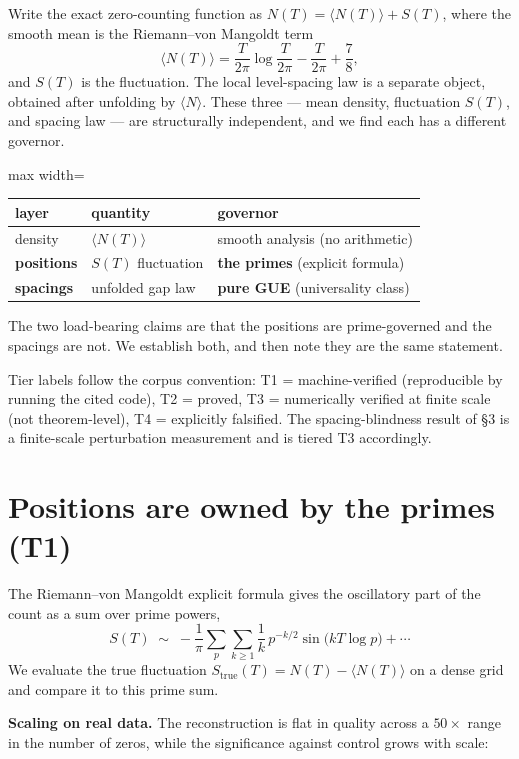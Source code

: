 \documentclass[11pt]{article}
\begin{document}
Write the exact zero-counting function as $N(T) = \langle N(T)\rangle + S(T)$, where the smooth mean is the Riemann--von Mangoldt term
\[
\langle N(T)\rangle = \frac{T}{2\pi}\log\frac{T}{2\pi} - \frac{T}{2\pi} + \frac{7}{8},
\]
and $S(T)$ is the fluctuation. The local level-spacing law is a separate object, obtained after unfolding by $\langle N\rangle$. These three --- mean density, fluctuation $S(T)$, and spacing law --- are structurally independent, and we find each has a different governor.

\begin{center}
\begin{adjustbox}{max width=\linewidth}\begin{tabular}{lll}
\toprule
layer & quantity & governor \\
\midrule
density & $\langle N(T)\rangle$ & smooth analysis (no arithmetic) \\
\textbf{positions} & $S(T)$ fluctuation & \textbf{the primes} (explicit formula) \\
\textbf{spacings} & unfolded gap law & \textbf{pure GUE} (universality class) \\
\bottomrule
\end{tabular}\end{adjustbox}
\end{center}

The two load-bearing claims are that the positions are prime-governed and the spacings are not. We establish both, and then note they are the same statement.

Tier labels follow the corpus convention: T1 = machine-verified (reproducible by running the cited code), T2 = proved, T3 = numerically verified at finite scale (not theorem-level), T4 = explicitly falsified. The spacing-blindness result of \S3 is a finite-scale perturbation measurement and is tiered T3 accordingly.

\section{Positions are owned by the primes (T1)}

The Riemann--von Mangoldt explicit formula gives the oscillatory part of the count as a sum over prime powers,
\[
S(T)\;\sim\;-\frac{1}{\pi}\sum_{p}\sum_{k\ge1}\frac{1}{k}\,p^{-k/2}\sin\!\big(kT\log p\big)+\cdots
\]
We evaluate the true fluctuation $S_{\mathrm{true}}(T)=N(T)-\langle N(T)\rangle$ on a dense grid and compare it to this prime sum.

\textbf{Scaling on real data.} The reconstruction is flat in quality across a $50\times$ range in the number of zeros, while the significance against control grows with scale:
\end{document}
